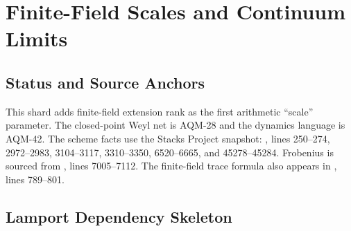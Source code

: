 
\section{Finite-Field Scales and Continuum Limits}
\label{sec:finite-field-scale-continuum-limits}

\subsection{Status and Source Anchors}

This shard adds finite-field extension rank as the first arithmetic
``scale'' parameter.  The closed-point Weyl net is AQM-28 and the dynamics
language is AQM-42.  The scheme facts use the Stacks Project snapshot:
, lines
250--274, 2972--2983, 3104--3117, 3310--3350, 6520--6665, and 45278--45284.
Frobenius is sourced from
, lines
7005--7112.  The finite-field trace formula also appears in
,
lines 789--801.

\subsection{Lamport Dependency Skeleton}

